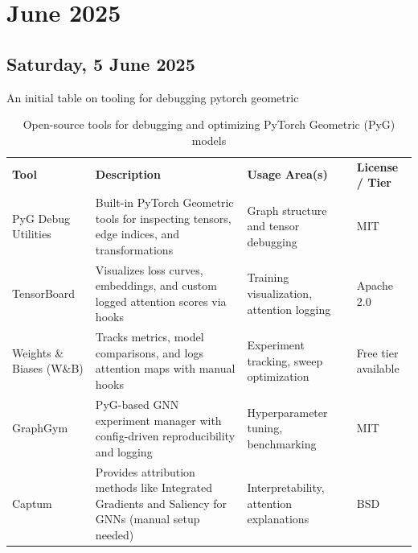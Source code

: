 \chapter[2025 June]{June 2025}

\section[2025/06/05]{Saturday, 5 June 2025}
\label{sec:20250605}

An initial table on tooling for debugging pytorch geometric

\begin{table}[H]
	\centering
	\caption{Open-source tools for debugging and optimizing PyTorch Geometric (PyG) models}
	\label{tab:pyg_debugging_tools}
	\begin{tabular}{ !{\vrule width 1.1pt}
		p{3cm}!{\vrule width 1pt}
		p{5cm}!{\vrule width 1pt}
		p{3.5cm}!{\vrule width 1pt}
		p{2.5cm}!{\vrule width 1.1pt}}
		 \textbf{Tool}          &
		 \textbf{Description}   &
		 \textbf{Usage Area(s)} &
		 \textbf{License / Tier}
		\\ 

		PyG Debug Utilities                          & Built-in PyTorch Geometric tools for inspecting tensors, edge indices, and transformations         & Graph structure and tensor debugging      & MIT
		\\ \hline

		TensorBoard                                  & Visualizes loss curves, embeddings, and custom logged attention scores via hooks                   & Training visualization, attention logging & Apache 2.0
		\\ \hline

		Weights \& Biases (W\&B)                     & Tracks metrics, model comparisons, and logs attention maps with manual hooks                       & Experiment tracking, sweep optimization   & Free tier available
		\\ \hline

		GraphGym                                     & PyG-based GNN experiment manager with config-driven reproducibility and logging                    & Hyperparameter tuning, benchmarking       & MIT
		\\ \hline

		Captum                                       & Provides attribution methods like Integrated Gradients and Saliency for GNNs (manual setup needed) & Interpretability, attention explanations  & BSD
		\\ \hline


\end{tabular}
\end{table}
